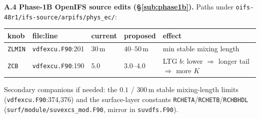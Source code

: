 \documentclass[10pt]{article}
\begin{document}
\textbf{A.4 Phase-1B OpenIFS source edits (\S\ref{sub:phase1b}).} Paths under
\texttt{oifs-48r1/ifs-source/arpifs/phys\_ec/}:
\begin{center}\small
\begin{tabular}{l l l l l}
\toprule
knob & file:line & current & proposed & effect \\
\midrule
\texttt{ZLMIN} & \texttt{vdfexcu.F90}:201 & $30$\,m & $40$--$50$\,m & min stable mixing length \\
\texttt{ZCB}   & \texttt{vdfexcu.F90}:190 & $5.0$ & $3.0$--$4.0$ & LTG $b$: lower $\Rightarrow$ longer tail $\Rightarrow$ more $K$ \\
\bottomrule
\end{tabular}
\end{center}
Secondary companions if needed: the $0.1$ / $300$\,m stable mixing-length limits (\texttt{vdfexcu.F90}:374,376) and the
surface-layer constants \texttt{RCHETA}/\texttt{RCHETB}/\texttt{RCHBHDL} (\texttt{surf/module/suvexcs\_mod.F90}, mirror
in \texttt{suvdfs.F90}).
\end{document}
